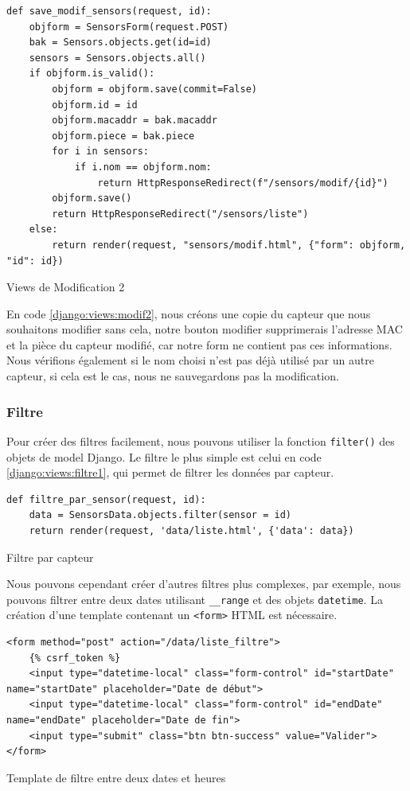 \documentclass{article}
\begin{document}
\begin{listing}[H]
    \begin{verbatim}
def save_modif_sensors(request, id):
    objform = SensorsForm(request.POST)
    bak = Sensors.objects.get(id=id)
    sensors = Sensors.objects.all()
    if objform.is_valid():
        objform = objform.save(commit=False)
        objform.id = id
        objform.macaddr = bak.macaddr
        objform.piece = bak.piece
        for i in sensors:
            if i.nom == objform.nom:
                return HttpResponseRedirect(f"/sensors/modif/{id}")
        objform.save()
        return HttpResponseRedirect("/sensors/liste")
    else:
        return render(request, "sensors/modif.html", {"form": objform, "id": id})
    \end{verbatim}
    \caption{Views de Modification 2}
    \label{django:views:modif2}
\end{listing}
En code \ref{django:views:modif2}, nous créons une copie du capteur que nous souhaitons modifier sans cela, notre bouton modifier supprimerais l'adresse MAC et la pièce du capteur modifié, car notre form ne contient pas ces informations.
Nous vérifions également si le nom choisi n'est pas déjà utilisé par un autre capteur, si cela est le cas, nous ne sauvegardons pas la modification.

\subsubsection{Filtre}
Pour créer des filtres facilement, nous pouvons utiliser la fonction \verb|filter()| des objets de model Django. Le filtre le plus simple est celui en code \ref{django:views:filtre1}, qui permet de filtrer les données par capteur.
\begin{listing}[H]
    \begin{verbatim}
def filtre_par_sensor(request, id):
    data = SensorsData.objects.filter(sensor = id)
    return render(request, 'data/liste.html', {'data': data})
    \end{verbatim}
    \caption{Filtre par capteur}
    \label{django:views:filtre1}
\end{listing}

Nous pouvons cependant créer d'autres filtres plus complexes, par exemple, nous pouvons filtrer entre deux dates utilisant \verb|__range| et des objets \verb|datetime|. La création d'une template contenant un \verb|<form>| HTML est nécessaire.
\begin{listing}[H]
    \begin{verbatim}
<form method="post" action="/data/liste_filtre">
    {% csrf_token %}
    <input type="datetime-local" class="form-control" id="startDate" name="startDate" placeholder="Date de début">
    <input type="datetime-local" class="form-control" id="endDate" name="endDate" placeholder="Date de fin">
    <input type="submit" class="btn btn-success" value="Valider">
</form>
    \end{verbatim}
    \caption{Template de filtre entre deux dates et heures}
    \label{template:filtre}
\end{listing}
\end{document}
